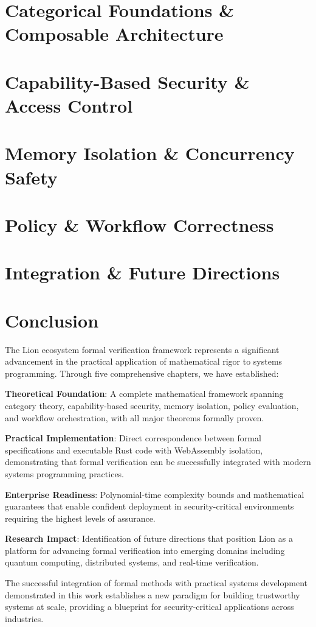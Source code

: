 \documentclass[11pt,a4paper]{book}
\theoremstyle{definition}
\theoremstyle{remark}
\begin{document}
\tableofcontents

\chapter{Categorical Foundations \& Composable Architecture}


\chapter{Capability-Based Security \& Access Control}


\chapter{Memory Isolation \& Concurrency Safety}


\chapter{Policy \& Workflow Correctness}


\chapter{Integration \& Future Directions}


\nocite{*}  %
\printbibliography[title={Bibliography}]

\chapter{Conclusion}

The Lion ecosystem formal verification framework represents a significant advancement in the practical application of mathematical rigor to systems programming. Through five comprehensive chapters, we have established:

\textbf{Theoretical Foundation}: A complete mathematical framework spanning category theory, capability-based security, memory isolation, policy evaluation, and workflow orchestration, with all major theorems formally proven.

\textbf{Practical Implementation}: Direct correspondence between formal specifications and executable Rust code with WebAssembly isolation, demonstrating that formal verification can be successfully integrated with modern systems programming practices.

\textbf{Enterprise Readiness}: Polynomial-time complexity bounds and mathematical guarantees that enable confident deployment in security-critical environments requiring the highest levels of assurance.

\textbf{Research Impact}: Identification of future directions that position Lion as a platform for advancing formal verification into emerging domains including quantum computing, distributed systems, and real-time verification.

The successful integration of formal methods with practical systems development demonstrated in this work establishes a new paradigm for building trustworthy systems at scale, providing a blueprint for security-critical applications across industries.
\end{document}
